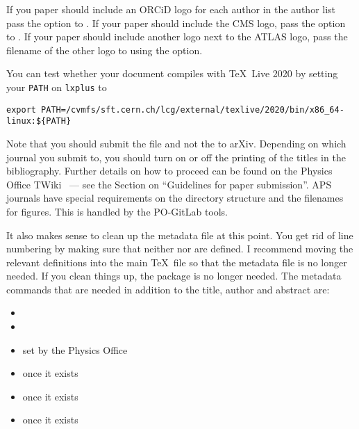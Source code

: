 If you paper should include an ORCiD logo for each author in the author list
pass the option  to .
If your paper should include the CMS logo, pass the option  to .
If your paper should include another logo next to the ATLAS logo,
pass the filename of the other logo to  using the  option.

You can test whether your document compiles with \TeX\ Live 2020 by setting your \texttt{PATH} on \texttt{lxplus} to
{\small
\begin{verbatim}
export PATH=/cvmfs/sft.cern.ch/lcg/external/texlive/2020/bin/x86_64-linux:${PATH}
\end{verbatim}
}

Note that you should submit the  file and not the  to arXiv.
Depending on which journal you submit to, you should turn on or off the printing of the titles in the bibliography.
Further details on how to proceed can be found on the Physics Office TWiki~\cite{atlas-physicsoffice} --- see
the Section on \enquote{Guidelines for paper submission}.
APS journals have special requirements on the directory structure and the filenames for figures.
This is handled by the PO-GitLab tools.

It also makes sense to clean up the metadata file at this point.
You get rid of line numbering by making sure that neither  nor  are defined.
I recommend moving the relevant definitions into the main \TeX\ file so that the metadata file is no longer needed.
If you clean things up, the  package is no longer needed.
The metadata commands that are needed in addition to the title, author and abstract are:
\begin{itemize}
  \item {}
  \item {}
  \item {} set by the Physics Office
  \item {} once it exists
  \item {} once it exists
  \item {} once it exists
\end{itemize}

